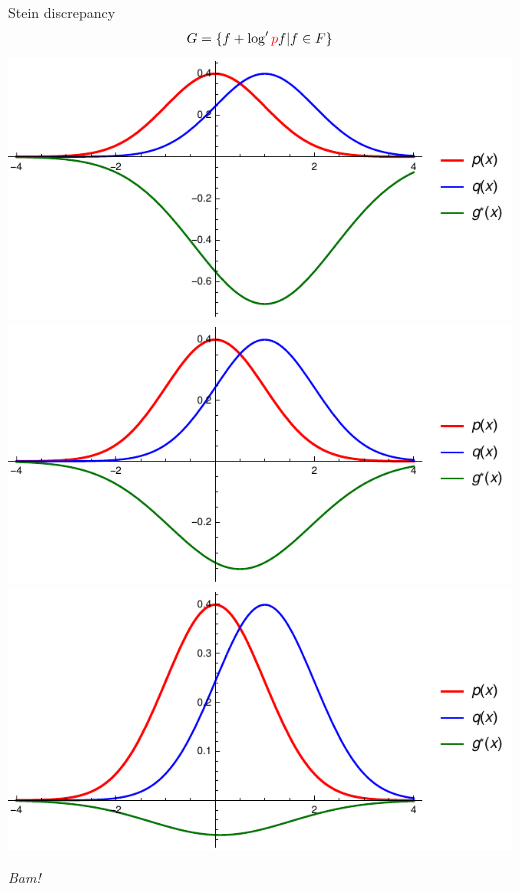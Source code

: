 \begin{frame}
\begin{columns}
\begin{column}{.33\linewidth}
\begin{block}{Stein discrepancy}
 \begin{align*}
G = \{ f  +  \log' {\color{red} p} f | f \in F \}
\end{align*}
\includegraphics[scale=1]{./img/s1.pdf}
\includegraphics[scale=1]{./img/s05.pdf}
\includegraphics[scale=1]{./img/s01.pdf}


\vspace{1cm}
\begin{center}
\emph{Bam!}
\end{center}
\end{block}
\end{column}


\end{columns}
\end{frame}
